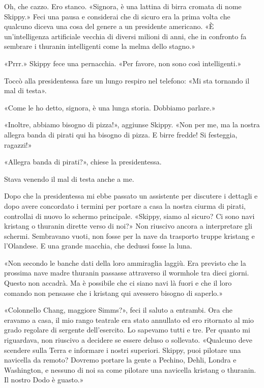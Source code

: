 Oh, che cazzo. Ero stanco. «Signora, è una lattina di birra cromata di
nome Skippy.» Feci una pausa e considerai che di sicuro era la prima
volta che qualcuno diceva una cosa del genere a un presidente americano.
«È un'intelligenza artificiale vecchia di diversi milioni di anni, che
in confronto fa sembrare i thuranin intelligenti come la melma dello
stagno.»

«Prrr.» Skippy fece una pernacchia. «Per favore, non sono così
intelligenti.»

Toccò alla presidentessa fare un lungo respiro nel telefono: «Mi sta
tornando il mal di testa».

«Come le ho detto, signora, è una lunga storia. Dobbiamo parlare.»

«Inoltre, abbiamo bisogno di pizza!», aggiunse Skippy. «Non per me, ma
la nostra allegra banda di pirati qui ha bisogno di pizza. E birre
fredde! Si festeggia, ragazzi!»

«Allegra banda di pirati?», chiese la presidentessa.

Stava venendo il mal di testa anche a me.

\hfill\break

Dopo che la presidentessa mi ebbe passato un assistente per discutere i
dettagli e dopo avere concordato i termini per portare a casa la nostra
ciurma di pirati, controllai di nuovo lo schermo principale. «Skippy,
siamo al sicuro? Ci sono navi kristang o thuranin dirette verso di noi?»
Non riuscivo ancora a interpretare gli schermi. Sembravano vuoti, non
fosse per la nave da trasporto truppe kristang e l'Olandese. E una
grande macchia, che dedussi fosse la luna.

«Non secondo le banche dati della loro ammiraglia laggiù. Era previsto
che la prossima nave madre thuranin passasse attraverso il wormhole tra
dieci giorni. Questo non accadrà. Ma è possibile che ci siano navi là
fuori e che il loro comando non pensasse che i kristang qui avessero
bisogno di saperlo.»

«Colonnello Chang, maggiore Simms?», feci il saluto a entrambi. Ora che
eravamo a casa, il mio rango teatrale era stato annullato ed ero
ritornato al mio grado regolare di sergente dell'esercito. Lo sapevamo
tutti e tre. Per quanto mi riguardava, non riuscivo a decidere se essere
deluso o sollevato. «Qualcuno deve scendere sulla Terra e informare i
nostri superiori. Skippy, puoi pilotare una navicella da remoto? Dovremo
portare la gente a Pechino, Dehli, Londra e Washington, e nessuno di noi
sa come pilotare una navicella kristang o thuranin. Il nostro Dodo è
guasto.»

